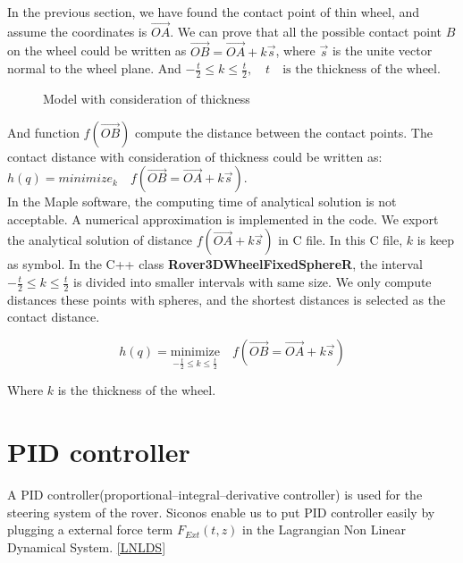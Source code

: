 In the previous section, we have found the contact point of thin wheel, and assume the coordinates is $\overrightarrow{OA}$. We can prove that all the possible contact point $B$ on the wheel could be written as $\overrightarrow{OB}=\overrightarrow{OA}+k\vec{s}$, where $\vec{s}$ is the unite vector normal to the wheel plane. And $-\frac{t}{2}\le k \le \frac{t}{2}, \quad t \quad \text{is the thickness of the wheel}$.

\begin{figure}[H]
\begin{center}
 
\caption{Model with consideration of thickness}
\label{Thickness}
\end{center}
\end{figure}

And function $f(\overrightarrow{OB})$ compute the distance between the contact points. The contact distance with consideration of thickness could be written as: $h(q)=minimize_{k} \quad f(\overrightarrow{OB}=\overrightarrow{OA}+k\vec{s})$.\\

In the Maple software, the computing time of analytical solution is not acceptable. A numerical approximation is implemented in the code. We export the analytical solution of distance $f(\overrightarrow{OA}+k\vec{s})$ in C file. In this C file, $k$ is keep as symbol. In the C++ class \textbf{Rover3DWheelFixedSphereR}, the interval $-\frac{t}{2}\le k \le \frac{t}{2}$ is divided into smaller intervals with same size. We only compute distances these points with spheres, and the shortest distances is selected as the contact distance.


\begin{equation}
h(q)= \underset{-\frac{t}{2}\le k \le \frac{t}{2}}{\text{minimize}}\quad f(\overrightarrow{OB}=\overrightarrow{OA}+k\vec{s})
\end{equation}


Where $k$ is the thickness of the wheel.
\section{PID controller}



A PID controller(proportional–integral–derivative controller) is used for the steering system of the rover.
Siconos enable us to put PID controller easily by plugging a external force term  $F_{Ext}(t,z)$ in the Lagrangian Non Linear Dynamical System. \ref{LNLDS}

